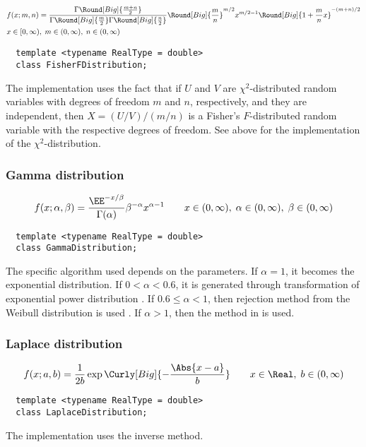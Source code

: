 \begin{align*}
  & f(x;m,n) =
  \frac{\Gamma\Round[Big]{\frac{m + n}{2}}}{
    \Gamma\Round[Big]{\frac{m}{2}}\Gamma\Round[Big]{\frac{n}{2}}}
  \Round[Big]{\frac{m}{n}}^{m/2} x^{m / 2 - 1}
  \Round[Big]{1 + \frac{m}{n}x}^{-(m + n) / 2} \\
  & x \in [0, \infty),\; m \in (0, \infty),\; n \in (0, \infty)
\end{align*}
\begin{Verbatim}
  template <typename RealType = double>
  class FisherFDistribution;
\end{Verbatim}
The implementation uses the fact that if $U$ and $V$ are $\chi^2$-distributed
random variables with degrees of freedom $m$ and $n$, respectively, and they
are independent, then $X = (U / V) / (m / n)$ is a Fisher's $F$-distributed
random variable with the respective degrees of freedom. See above for the
implementation of the $\chi^2$-distribution.

\subsubsection{Gamma distribution}

\begin{equation*}
  f(x;\alpha,\beta) =
  \frac{\EE^{-x/\beta}}{\Gamma(\alpha)}\beta^{-\alpha}x^{\alpha-1} \qquad
  x \in (0, \infty),\; \alpha \in (0, \infty),\; \beta \in (0, \infty)
\end{equation*}
\begin{Verbatim}
  template <typename RealType = double>
  class GammaDistribution;
\end{Verbatim}
The specific algorithm used depends on the parameters. If $\alpha = 1$, it
becomes the exponential distribution. If $0 < \alpha < 0.6$, it is generated
through transformation of exponential power distribution
\cite[sec~2.6]{Devroye:1986gi}. If $0.6\le\alpha<1$, then rejection method from
the Weibull distribution is used \parencite[sec.~3.4]{Devroye:1986gi}. If
$\alpha > 1$, then the method in \textcite{Marsaglia:2000vq} is used.

\subsubsection{Laplace distribution}

\begin{equation*}
  f(x;a,b) = \frac{1}{2b}\exp\Curly[Big]{-\frac{\Abs{x - a}}{b}} \qquad
  x \in \Real,\; b \in (0, \infty)
\end{equation*}
\begin{Verbatim}
  template <typename RealType = double>
  class LaplaceDistribution;
\end{Verbatim}
The implementation uses the inverse method.

